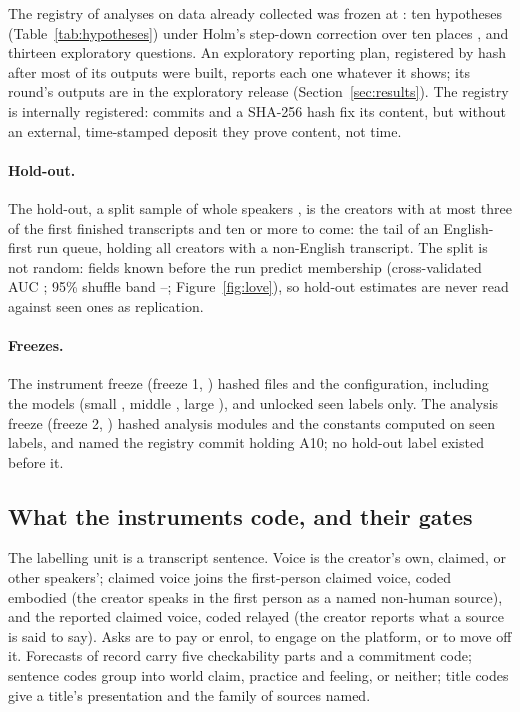The registry of analyses on data already collected \cite{vandenakker2021preregistration,weston2019recommendations}
was frozen at \RegistryFrozenStamp: ten hypotheses (Table~\ref{tab:hypotheses}) under Holm's step-down correction
over ten places \cite{holm1979simple}, and thirteen exploratory questions. An exploratory reporting plan, registered by
hash after most of its outputs were built, reports each one whatever it shows; its round's outputs are in the
exploratory release (Section~\ref{sec:results}). The registry is internally registered: commits and
a SHA-256 hash fix its content, but without an external, time-stamped deposit \cite{nosek2018preregistration} they
prove content, not time.

\paragraph{Hold-out.}\label{sec:holdout}
The hold-out, a split sample of whole speakers \cite{anderson2017splitsample,egami2022make}, is the \NHoldout{}
creators with at most three of the first \SnapLines{} finished transcripts and ten or more to come: the tail of an
English-first run queue, holding all \NNonEnglishCreators{} creators with a non-English transcript. The split is not
random: fields known before the run predict membership (cross-validated AUC \DTwoAuc; 95\% shuffle band
\DTwoAucBandLo--\DTwoAucBandHi; Figure~\ref{fig:love}), so hold-out estimates are never read against seen ones as
replication.

\paragraph{Freezes.}\label{sec:freezes}
The instrument freeze (freeze 1, \FreezeOneStamp) hashed \FreezeOneFiles{} files and the configuration, including
the models (small \ModelSmall, middle \ModelMiddle, large \ModelLarge), and unlocked seen labels only. The analysis
freeze (freeze 2, \FreezeTwoStamp) hashed \FreezeTwoModules{} analysis modules and the constants computed on seen
labels, and named the registry commit holding A10; no hold-out label existed before it.

\subsection{What the instruments code, and their gates}
\label{sec:instruments}

The labelling unit is a transcript sentence. Voice is the creator's own, claimed, or other speakers'; claimed
voice joins the first-person claimed voice, coded embodied (the creator speaks in the first person as a named
non-human source), and the reported claimed voice, coded relayed (the creator reports what a source is said to say). Asks are to pay or enrol, to engage on the
platform, or to move off it. Forecasts of record carry five checkability parts and a commitment code; sentence codes
group into world claim, practice and feeling, or neither; title codes give a title's presentation and the family of
sources named.

